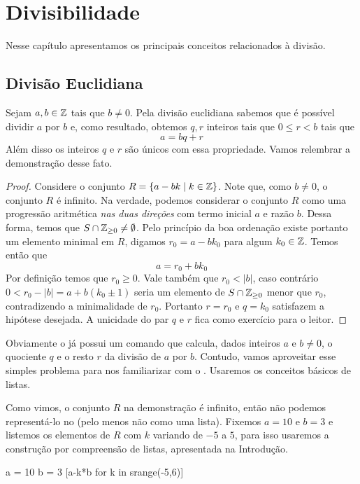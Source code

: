 \chapter{Divisibilidade}
\label{chap:div}

Nesse capítulo apresentamos os principais conceitos relacionados
à divisão.

\section{Divisão Euclidiana}

Sejam $a, b \in \mathbb{Z}$ tais que $b \neq 0$.
Pela divisão euclidiana sabemos que é possível dividir
$a$ por $b$ e, como resultado, obtemos $q, r$ inteiros tais que
$0\leq r < b$ tais que
$$
  a = bq + r
$$
Além disso os inteiros $q$ e $r$ são únicos com essa
propriedade. Vamos relembrar a demonstração desse fato.
\begin{proof}
  Considere o conjunto $R = \{a-bk\mid k \in \mathbb{Z}\}$. Note que,
  como $b \neq 0$, o conjunto $R$ é infinito. Na verdade, podemos
  considerar o conjunto $R$ como uma progressão aritmética
  \emph{nas duas direções} com termo inicial $a$ e razão $b$.
  Dessa forma, temos que $S\cap \mathbb{Z}_{\geq 0} \neq \emptyset$.
  Pelo princípio da boa ordenação existe portanto
  um elemento minimal em $R$, digamos $r_0 = a-bk_0$ para
  algum $k_0 \in \mathbb{Z}$. Temos então que 
  $$
    a = r_0 + bk_0
  $$
  Por definição temos que $r_0 \geq 0$. Vale também
  que $r_0 <|b|$, caso contrário $0<r_0 - |b| = a+b(k_0 \pm 1)$ 
  seria um elemento de $S\cap \mathbb{Z}_{\geq 0}$
  menor que $r_0$, contradizendo
  a minimalidade de $r_0$.
  Portanto $r = r_0$ e $q = k_0$ satisfazem a hipótese 
  desejada. A unicidade do par $q$ e $r$ fica como
  exercício para o leitor.
\end{proof}


Obviamente o \Sage já possui um comando que calcula,
dados  inteiros $a$ e $b\neq 0$, o quociente $q$
e o resto $r$ da divisão de $a$ por $b$. Contudo, vamos
aproveitar esse simples problema para nos
familiarizar com o \sage. Usaremos os conceitos
básicos de listas.

Como vimos, o
conjunto $R$ na demonstração é infinito, então não podemos
representá-lo no \Sage (pelo menos não como uma lista). Fixemos $a = 10$
e $b = 3$ e listemos
os elementos de $R$ com $k$ variando de $-5$ a $5$,
para isso usaremos a construção por compreensão de listas,
apresentada na Introdução.

\begin{sageinput}
a = 10
b = 3
[a-k*b for k in srange(-5,6)]
\end{sageinput}
\begin{sageoutput}
[25, 22, 19, 16, 13, 10, 7, 4, 1, -2, -5]
\end{sageoutput}

